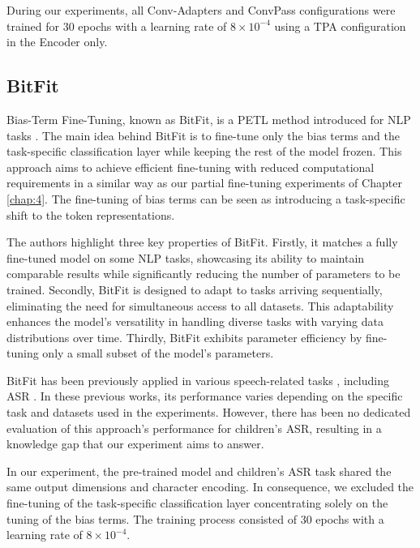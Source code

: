 During our experiments, all Conv-Adapters and ConvPass configurations were trained for 30 epochs with a learning rate of $8 \times 10^{-4}$ using a \ac{TPA} configuration in the Encoder only.


\subsection{BitFit}
Bias-Term Fine-Tuning, known as BitFit, is a \ac{PETL} method introduced for \ac{NLP} tasks \cite{ben-zaken-etal-2022-bitfit}. The main idea behind BitFit is to fine-tune only the bias terms and the task-specific classification layer while keeping the rest of the model frozen. This approach aims to achieve efficient fine-tuning with reduced computational requirements in a similar way as our partial fine-tuning experiments of Chapter \ref{chap:4}. The fine-tuning of bias terms can be seen as introducing a task-specific shift to the token representations.

The authors highlight three key properties of BitFit. Firstly, it matches a fully fine-tuned model on some \ac{NLP} tasks, showcasing its ability to maintain comparable results while significantly reducing the number of parameters to be trained. Secondly, BitFit is designed to adapt to tasks arriving sequentially, eliminating the need for simultaneous access to all datasets. This adaptability enhances the model's versatility in handling diverse tasks with varying data distributions over time. Thirdly, BitFit exhibits parameter efficiency by fine-tuning only a small subset of the model's parameters.

BitFit has been previously applied in various speech-related tasks \cite{cappellazzo2023parameter,hsieh23_interspeech}, including \ac{ASR} \cite{ng23c_interspeech2}. In these previous works, its performance varies depending on the specific task and datasets used in the experiments. However, there has been no dedicated evaluation of this approach's performance for children's \ac{ASR}, resulting in a knowledge gap that our experiment aims to answer.


In our experiment, the pre-trained model and children's \ac{ASR} task shared the same output dimensions and character encoding. In consequence, we excluded the fine-tuning of the task-specific classification layer concentrating solely on the tuning of the bias terms. The training process consisted of 30 epochs with a learning rate of $8 \times 10^{-4}$.

